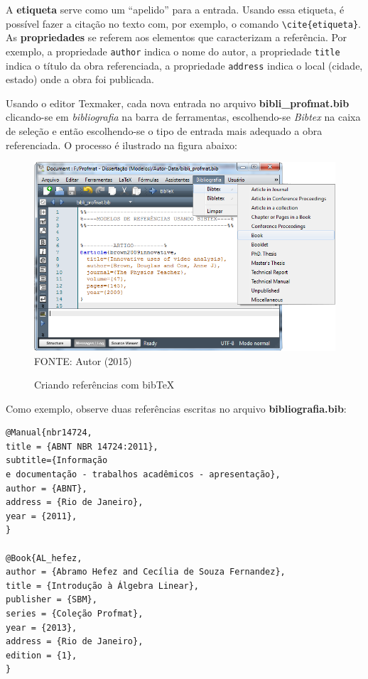 A \textbf{etiqueta} serve como um ``apelido'' para a entrada. Usando essa etiqueta, é possível fazer a citação no texto com, por exemplo, o comando \verb!\cite{etiqueta}!. As \textbf{propriedades} se referem aos elementos que caracterizam a referência. Por exemplo, a propriedade \verb!author! indica o nome do autor, a propriedade \verb!title! indica o título da obra referenciada, a propriedade \verb!address! indica o local (cidade, estado) onde a obra foi publicada.

Usando o editor Texmaker, cada nova entrada no arquivo \textbf{bibli\_profmat.bib} clicando-se em \textsl{bibliografia} na barra de ferramentas, escolhendo-se \textsl{Bibtex} na caixa de seleção e então escolhendo-se o tipo de entrada mais adequado a obra referenciada. O processo é ilustrado na figura abaixo:
	\begin{figure}[H]
	\centering
	\caption{Criando referências com bibTeX}
	\includegraphics[scale=0.45]
	{img/fig08.png}\label{fig08}\\
	FONTE: Autor (2015)
	\end{figure}


 Como exemplo, observe duas referências escritas no arquivo \textbf{bibliografia.bib}:
\begin{verbatim}
@Manual{nbr14724,
title = {ABNT NBR 14724:2011},
subtitle={Informação
e documentação - trabalhos acadêmicos - apresentação},
author = {ABNT},
address = {Rio de Janeiro},
year = {2011},
}

@Book{AL_hefez,
author = {Abramo Hefez and Cecília de Souza Fernandez},
title = {Introdução à Álgebra Linear},
publisher = {SBM},
series = {Coleção Profmat},
year = {2013},
address = {Rio de Janeiro},
edition = {1},
}
\end{verbatim}

